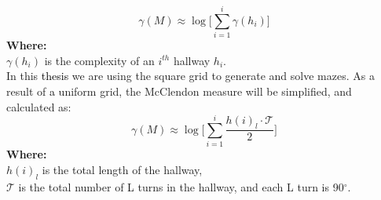 \begin{equation}
\gamma(M) \approx \log \bigl[\sum_{i =1}^{i}\gamma(h_i)\bigr]
\end{equation}
\textbf{Where:}\\
$\gamma(h_i)$ is the complexity of an $i^{th}$ hallway $h_i$.\\
 \newline
In this \textcolor{black}{thesis} we are using the square grid to generate and solve mazes. As a result of \textcolor{black}{a} uniform grid, the McClendon measure will be simplified, and calculated as:
\begin{equation} 
\gamma(M) \approx \log \bigl[\sum_{i =1}^{i}\frac{h(i)_l\cdot \mathcal{T}}{2}\bigr]
\end{equation}
\textbf{Where:}\\
$h(i)_l$ is the total length of the hallway,\\
$\mathcal{T}$ is the total number of L turns in the hallway, and each L turn is 90$^\circ$.%
